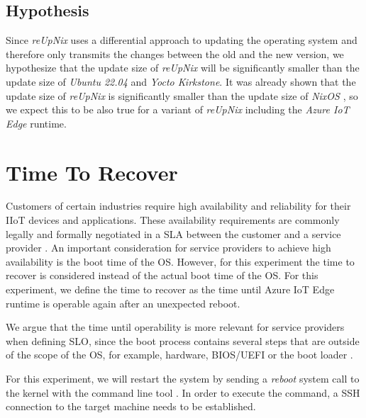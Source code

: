 \subsection{Hypothesis}

Since \textit{reUpNix} uses a differential approach to updating the operating
system and therefore only transmits the changes between the old and the new
version, we hypothesize that the update size of \textit{reUpNix} will be
significantly smaller than the update size of \textit{Ubuntu 22.04} and
\textit{Yocto Kirkstone}. It was already shown that the update size of
\textit{reUpNix} is significantly smaller than the update size of \textit{NixOS}
\cite{gollenstede:23:lctes}, so we expect this to be also true for a variant
of \textit{reUpNix} including the \textit{Azure IoT Edge} runtime.

\section{Time To Recover}
\label{sec:time-to-recover}
Customers of certain industries require high availability and reliability for
their \ac{IIoT} devices and applications. These availability requirements
are commonly legally and formally negotiated in a \ac{SLA} between
the customer and a service provider \cite{msdoc-slas}. An important consideration
for service providers to achieve high availability is the boot time of the
\ac{OS}. However, for this experiment the time to recover is considered
instead of the actual boot time of the \ac{OS}. For this experiment, we define the
time to recover as the time until Azure IoT Edge runtime is operable again after
an unexpected reboot.

We argue that the time until operability is more relevant for service providers
when defining \ac{SLO}, since the boot process contains several steps that are
outside of the scope of the \ac{OS}, for example, hardware, BIOS/UEFI or the boot
loader \cite{almesberg}.

For this experiment, we will restart the system by sending a \textit{reboot} system
call to the kernel with the  command line tool \cite{man-reboot}.
In order to execute the command, a \ac{SSH} connection to the target machine
needs to be established.

\clearpage

